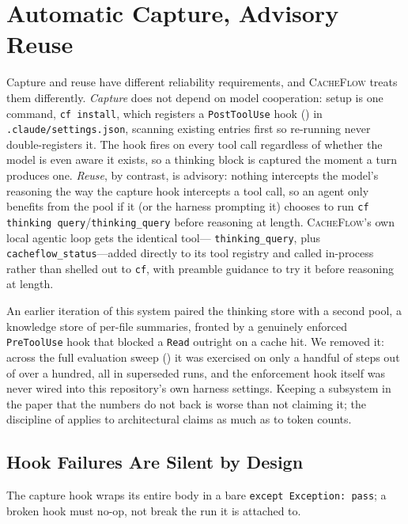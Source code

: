 \documentclass[10pt]{article}
\begin{document}
\section{Automatic Capture, Advisory Reuse}
\label{sec:enforce}

Capture and reuse have different reliability requirements, and
\textsc{CacheFlow} treats them differently. \emph{Capture} does not depend on
model cooperation: setup is one command, \texttt{cf install}, which registers
a \texttt{PostToolUse} hook () in \texttt{.claude/settings.json},
scanning existing entries first so re-running never double-registers it. The
hook fires on every tool call regardless of whether the model is even aware it
exists, so a thinking block is captured the moment a turn produces one.
\emph{Reuse}, by contrast, is advisory: nothing intercepts the model's
reasoning the way the capture hook intercepts a tool call, so an agent only
benefits from the pool if it (or the harness prompting it) chooses to run
\texttt{cf thinking query}/\texttt{thinking\_query} before reasoning at length.
\textsc{CacheFlow}'s own local agentic loop gets the identical tool---
\texttt{thinking\_query}, plus \texttt{cacheflow\_status}---added directly to
its tool registry and called in-process rather than shelled out to \texttt{cf},
with preamble guidance to try it before reasoning at length.

An earlier iteration of this system paired the thinking store with a second
pool, a knowledge store of per-file summaries, fronted by a genuinely enforced
\texttt{PreToolUse} hook that blocked a \texttt{Read} outright on a cache hit.
We removed it: across the full evaluation sweep () it was
exercised on only a handful of steps out of over a hundred, all in superseded
runs, and the enforcement hook itself was never wired into this repository's
own harness settings. Keeping a subsystem in the paper that the numbers do not
back is worse than not claiming it; the discipline of 
applies to architectural claims as much as to token counts.

\subsection{Hook Failures Are Silent by Design}
The capture hook wraps its entire body in a bare
\texttt{except Exception: pass}; a broken hook must no-op, not break the run
it is attached to.
\end{document}
